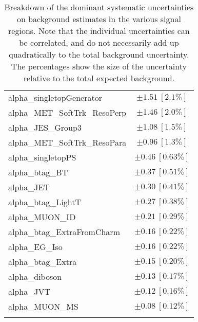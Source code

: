 \begin{table}
\begin{center}
\begin{tabular*}{\textwidth}{@{\extracolsep{\fill}}lc}
alpha\_singletopGenerator         & $\pm 1.51\ [2.1\%] $       \\
alpha\_MET\_SoftTrk\_ResoPerp         & $\pm 1.46\ [2.0\%] $       \\
alpha\_JES\_Group3         & $\pm 1.08\ [1.5\%] $       \\
alpha\_MET\_SoftTrk\_ResoPara         & $\pm 0.96\ [1.3\%] $       \\
alpha\_singletopPS         & $\pm 0.46\ [0.63\%] $       \\
alpha\_btag\_BT         & $\pm 0.37\ [0.51\%] $       \\
alpha\_JET         & $\pm 0.30\ [0.41\%] $       \\
alpha\_btag\_LightT         & $\pm 0.27\ [0.38\%] $       \\
alpha\_MUON\_ID         & $\pm 0.21\ [0.29\%] $       \\
alpha\_btag\_ExtraFromCharm         & $\pm 0.16\ [0.22\%] $       \\
alpha\_EG\_Iso         & $\pm 0.16\ [0.22\%] $       \\
alpha\_btag\_Extra         & $\pm 0.15\ [0.20\%] $       \\
alpha\_diboson         & $\pm 0.13\ [0.17\%] $       \\
alpha\_JVT         & $\pm 0.12\ [0.16\%] $       \\
alpha\_MUON\_MS         & $\pm 0.08\ [0.12\%] $       \\
\noalign{\smallskip}\hline\noalign{\smallskip}
\end{tabular*}
\end{center}
\caption[Breakdown of uncertainty on background estimates]{
Breakdown of the dominant systematic uncertainties on background estimates in the various signal regions.
Note that the individual uncertainties can be correlated, and do not necessarily add up quadratically to 
the total background uncertainty. The percentages show the size of the uncertainty relative to the total expected background.
\label{table.results.bkgestimate.uncertainties.WREM_cuts}}
\end{table}
%